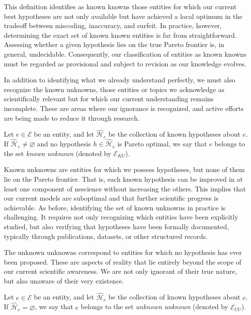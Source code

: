 This definition identifies as known knowns those entities for which our current best hypotheses are not only available but have achieved a local optimum in the tradeoff between miscoding, inaccuracy, and surfeit. In practice, however, determining the exact set of known known entities is far from straightforward. Assessing whether a given hypothesis lies on the true Pareto frontier is, in general, undecidable. Consequently, our classification of entities as known knowns must be regarded as provisional and subject to revision as our knowledge evolves.

In addition to identifying what we already understand perfectly, we must also recognize the known unknowns, those entities or topics we acknowledge as scientifically relevant but for which our current understanding remains incomplete. These are areas where our ignorance is recognized, and active efforts are being made to reduce it through research.

\begin{definition}
Let $e \in \mathcal{E}$ be an entity, and let $\hat{\mathcal{H}}_e$ be the collection of known hypotheses about $e$. If $\hat{\mathcal{H}}_e \neq \varnothing$ and no hypothesis $h \in \hat{\mathcal{H}}_e$ is Pareto optimal, we say that $e$ belongs to the set \emph{known unknown} (denoted by $\mathcal{E}_{KU}$).
\end{definition}

Known unknowns are entities for which we possess hypotheses, but none of them lie on the Pareto frontier. That is, each known hypothesis can be improved in at least one component of nescience without increasing the others. This implies that our current models are suboptimal and that further scientific progress is achievable. As before, identifying the set of known unknowns in practice is challenging. It requires not only recognizing which entities have been explicitly studied, but also verifying that hypotheses have been formally documented, typically through publications, datasets, or other structured records.

The unknown unknowns correspond to entities for which no hypothesis has ever been proposed. These are aspects of reality that lie entirely beyond the scope of our current scientific awareness. We are not only ignorant of their true nature, but also unaware of their very existence.

\begin{definition}
Let $e \in \mathcal{E}$ be an entity, and let $\hat{\mathcal{H}}_e$ be the collection of known hypotheses about $e$. If $\hat{\mathcal{H}}_e = \varnothing$, we say that $e$ belongs to the set \emph{unknown unknown} (denoted by $\mathcal{E}_{UU}$).
\end{definition}

